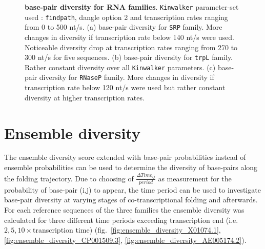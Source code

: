 \documentclass[ twoside,openright,titlepage,numbers=noenddot,headinclude,%
                footinclude=false, cleardoublepage=empty,abstractoff, %
                BCOR=5mm,paper=a4,fontsize=11pt,%
                ngerman,american,%
                ]{scrreprt}
\begin{document}
\begin{figure}[ht]
\caption{ {\bf base-pair diversity for RNA families}.
\texttt{Kinwalker} parameter-set used : \texttt{findpath}, dangle option 2 and transcription rates ranging from 0 to 500 nt/s.
(a) base-pair diversity for \texttt{SRP} family. 
More changes in diversity if transcription rate below 140 nt/s were used. Noticeable diversity drop at transcription rates ranging from 270 to 300 nt/s for five sequences.
(b) base-pair diversity for \texttt{trpL} family. 
Rather constant diversity over all \texttt{Kinwalker} parameters.
(c) base-pair diversity for \texttt{RNaseP} family. 
More changes in diversity if transcription rate below 120 nt/s were used but rather constant diversity at higher transcription rates.}
\label{fig:base-pair diversity alignments}
\end{figure}

			
%			
				
\FloatBarrier	
\section{Ensemble diversity} \label{result:ensemble diversity}

The ensemble diversity score extended with base-pair probabilities instead of ensemble probabilities can be used to determine 
the diversity of base-pairs along the folding trajectory. Due to choosing of $\frac{\Delta
  Time_{ij}}{period}$ as measurement for the probability of base-pair (i,j) to appear, the time period can be used to investigate base-pair diversity at varying stages of co-transcriptional folding and afterwards.
For each reference sequences of the three families the ensemble diversity
was calculated for three different time periods exceeding transcription end
(i.e. $2,5,10 \times$transcription time) (fig.~\ref{fig:ensemble_diversity_X01074.1}, \ref{fig:ensemble_diversity_CP001509.3},  \ref{fig:ensemble_diversity_AE005174.2}). 
\end{document}

